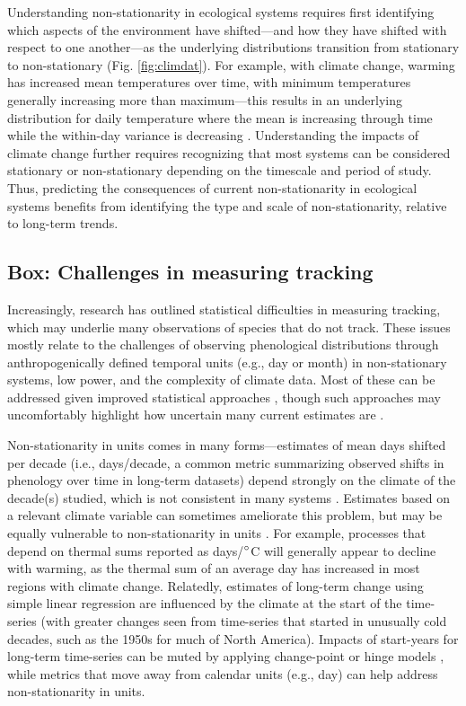\documentclass[11pt,letterpaper]{article}
\begin{document}
Understanding non-stationarity in ecological systems requires first identifying which aspects of the environment have shifted---and how they have shifted with respect to one another---as the underlying  distributions transition from stationary to non-stationary (Fig. \ref{fig:climdat}). For example, with climate change, warming has increased mean temperatures over time, with minimum temperatures generally increasing more than maximum---this results in an underlying distribution for daily temperature where the mean is increasing through time while the within-day variance is decreasing \citep{ipcc2013,screen2014}.  Understanding the impacts of climate change further requires recognizing that most systems can be considered stationary or non-stationary depending on the timescale and period of study. Thus, predicting the consequences of current non-stationarity in ecological systems benefits from identifying the type and scale of non-stationarity, relative to long-term trends.  



\subsection{Box: Challenges in measuring tracking} %
Increasingly, research has outlined statistical difficulties in measuring tracking, which may underlie many observations of species that do not track. These issues mostly relate to the challenges of observing phenological distributions \citep{steer2019,carter2018} through anthropogenically defined temporal units (e.g., day or month) in non-stationary systems, low power, and the complexity of climate data. Most of these can be addressed given improved statistical approaches \citep[e.g.,][]{gienapp2005,pearse2017}, though such approaches may uncomfortably highlight how uncertain many current estimates are \citep{brown2016}. 

Non-stationarity in units comes in many forms---estimates of mean days shifted per decade (i.e., days/decade, a common metric summarizing observed shifts in phenology over time in long-term datasets) depend strongly on the climate of the decade(s) studied, which is not consistent in many systems \citep{Ault2011,McCabe2012}. Estimates based on a relevant climate variable can sometimes ameliorate this problem, but may be equally vulnerable to non-stationarity in units \citep[e.g.,][]{Sagarin:2001fu}. For example, processes that depend on thermal sums reported as days/$\degree$C will generally appear to decline with warming, as the thermal sum of an average day has increased in most regions with climate change. Relatedly, estimates of long-term change using simple linear regression are influenced by the climate at the start of the time-series (with greater changes seen from time-series that started in unusually cold decades, such as the 1950s for much of North America). Impacts of start-years for long-term time-series can be muted by applying change-point or hinge models \citep[e.g.,][]{kharouba2018}, while metrics that move away from calendar units (e.g., day) can help address non-stationarity in units. 
\end{document}
